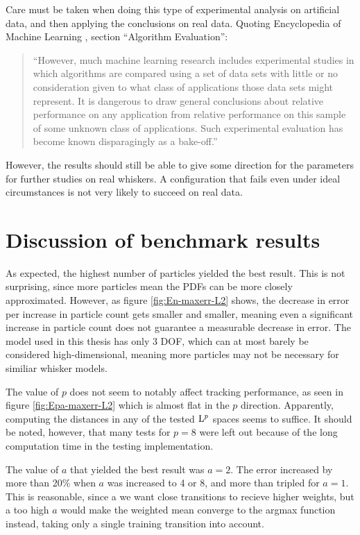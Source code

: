 

Care must be taken when doing this type of experimental analysis on
artificial data, and then applying the conclusions on real
data. Quoting Encyclopedia of Machine Learning
\cite{EncyclopediaMachineLearning}, section ``Algorithm Evaluation'':

\begin{quote}
  ``However, much machine learning research includes experimental
  studies in which algorithms are compared using a set of data sets
  with little or no consideration given to what class of applications
  those data sets might represent. It is dangerous to draw general
  conclusions about relative performance on any application from
  relative performance on this sample of some unknown class of
  applications. Such experimental evaluation has become known
  disparagingly as a bake-off.''
\end{quote}

However, the results should still be able to give some direction for
the parameters for further studies on real whiskers. A configuration
that fails even under ideal circumstances is not very likely to
succeed on real data.

\section{Discussion of benchmark results}
As expected, the highest number of particles yielded the best
result. This is not surprising, since more particles mean the PDFs can
be more closely approximated. However, as figure \ref{fig:En-maxerr-L2}
shows, the decrease in error per increase in particle count gets
smaller and smaller, meaning even a significant increase in particle
count does not guarantee a measurable decrease in error. The model
used in this thesis has only 3 DOF, which can at most barely be
considered high-dimensional, meaning more particles may not be
necessary for similiar whisker models.

The value of $p$ does not seem to notably affect tracking performance,
as seen in figure \ref{fig:Epa-maxerr-L2} which is almost flat in the
$p$ direction. Apparently, computing the distances in any of the
tested $\mathrm{L}^{p}$ spaces seems to suffice. It should be noted, however,
that many tests for $p=8$ were left out because of the long
computation time in the testing implementation.

The value of $a$ that yielded the best result was $a=2$. The error
increased by more than 20\% when $a$ was increased to 4 or 8, and more
than tripled for $a=1$. This is reasonable, since a we want close
transitions to recieve higher weights, but a too high $a$ would make
the weighted mean converge to the argmax function instead, taking only
a single training transition into account.

